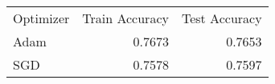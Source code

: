 \begin{tabular}{lrr}
Optimizer & Train Accuracy & Test Accuracy \\
Adam & 0.7673 & 0.7653 \\
SGD & 0.7578 & 0.7597 \\
\end{tabular}
